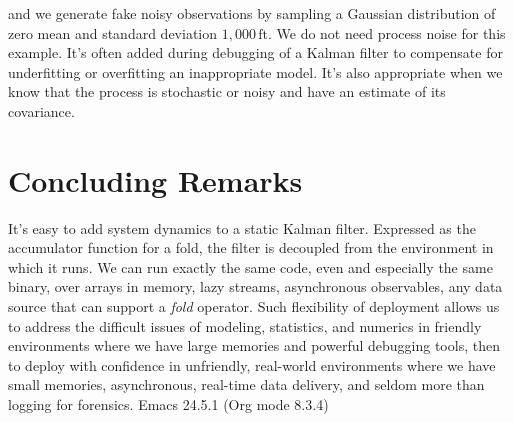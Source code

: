 \documentclass[10pt,oneside,x11names]{article}
\begin{document}
\noindent and we generate fake noisy observations by sampling a Gaussian
distribution of zero mean and standard deviation \(1,000\,\textrm{ft}\). We do not
need process noise for this example. It's often added during debugging of a
Kalman filter to compensate for underfitting or overfitting an inappropriate
model. It's also appropriate when we know that the process is stochastic or
noisy and have an estimate of its covariance.

\section{Concluding Remarks}
\label{sec:orgheadline8}

It's easy to add system dynamics to a static Kalman filter. Expressed as the
accumulator function for a fold, the filter is decoupled from the environment in
which it runs. We can run exactly the same code, even and especially the same
binary, over arrays in memory, lazy streams, asynchronous observables, any data
source that can support a \emph{fold} operator. Such flexibility of deployment allows
us to address the difficult issues of modeling, statistics, and numerics in
friendly environments where we have large memories and powerful debugging tools,
then to deploy with confidence in unfriendly, real-world environments where we
have small memories, asynchronous, real-time data delivery, and seldom more than
logging for forensics.
Emacs 24.5.1 (Org mode 8.3.4)
\end{document}
